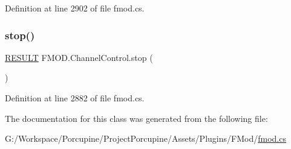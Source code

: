 Definition at line 2902 of file fmod.\+cs.

\mbox{\label{class_f_m_o_d_1_1_channel_control_ae7825e5305c127d4a9a856460839c7d9}} 
\subsubsection{\texorpdfstring{stop()}{stop()}}
{\footnotesize\ttfamily \hyperlink{namespace_f_m_o_d_a305d1176ef3f8c8815861a60407ac33d}{R\+E\+S\+U\+LT} F\+M\+O\+D.\+Channel\+Control.\+stop (\begin{DoxyParamCaption}{ }\end{DoxyParamCaption})}



Definition at line 2882 of file fmod.\+cs.



The documentation for this class was generated from the following file\+:\begin{DoxyCompactItemize}
\item 
G\+:/\+Workspace/\+Porcupine/\+Project\+Porcupine/\+Assets/\+Plugins/\+F\+Mod/\hyperlink{fmod_8cs}{fmod.\+cs}\end{DoxyCompactItemize}
